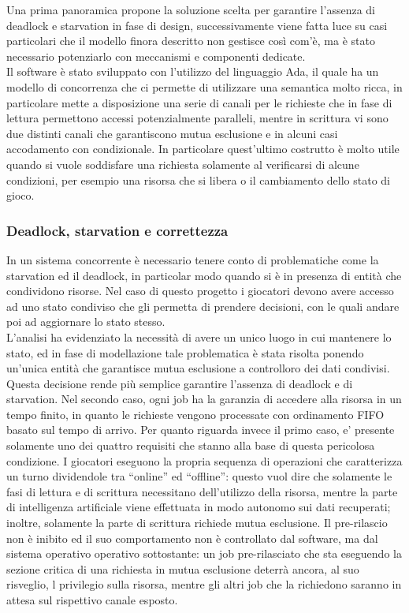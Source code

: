 Una prima panoramica propone la soluzione scelta per garantire l'assenza di deadlock e starvation in fase di design, successivamente viene fatta luce su casi particolari che il modello finora descritto non gestisce così com'è, ma è stato necessario potenziarlo con meccanismi e componenti dedicate.\\

Il software è stato sviluppato con l'utilizzo del linguaggio Ada, il quale ha un modello di concorrenza che ci permette di utilizzare una semantica molto ricca, in particolare mette a disposizione una serie di canali per le richieste che in fase di lettura permettono accessi potenzialmente paralleli, mentre in scrittura vi sono due distinti canali che garantiscono mutua esclusione e in alcuni casi accodamento con condizionale. In particolare quest'ultimo costrutto è molto utile quando si vuole soddisfare una richiesta solamente al verificarsi di alcune condizioni, per esempio una risorsa che si libera o il cambiamento dello stato di gioco.

\subsubsection{Deadlock, starvation e correttezza}
\label{sec:analisi_concorrenza_deadlock}

In un sistema concorrente è necessario tenere conto di problematiche come la starvation ed il deadlock, in particolar modo quando si è in presenza di entità che condividono risorse. Nel caso di questo progetto i giocatori devono avere accesso ad uno stato condiviso che gli permetta di prendere decisioni, con le quali andare poi ad aggiornare lo stato stesso.\\

L'analisi ha evidenziato la necessità di avere un unico luogo in cui mantenere lo stato, ed in fase di modellazione tale problematica è stata risolta ponendo un'unica entità che garantisce mutua esclusione a controlloro dei dati condivisi.\\

Questa decisione rende più semplice garantire l'assenza di deadlock e di starvation. Nel secondo caso, ogni job ha la garanzia di accedere alla risorsa in un tempo finito, in quanto le richieste vengono processate con ordinamento FIFO basato sul tempo di arrivo. Per quanto riguarda invece il primo caso, e' presente solamente uno dei quattro requisiti che stanno alla base di questa pericolosa condizione. I giocatori eseguono la propria sequenza di operazioni che caratterizza un turno dividendole tra ``online'' ed ``offline'': questo vuol dire che solamente le fasi di lettura e di scrittura necessitano dell'utilizzo della risorsa, mentre la parte di intelligenza artificiale viene effettuata in modo autonomo sui dati recuperati; inoltre, solamente la parte di scrittura richiede mutua esclusione. Il pre-rilascio non è inibito ed il suo comportamento non è controllato dal software, ma dal sistema operativo operativo sottostante: un job pre-rilasciato che sta eseguendo la sezione critica di una richiesta in mutua esclusione deterrà ancora, al suo risveglio, l privilegio sulla risorsa, mentre gli altri job che la richiedono saranno in attesa sul rispettivo canale esposto.\\


